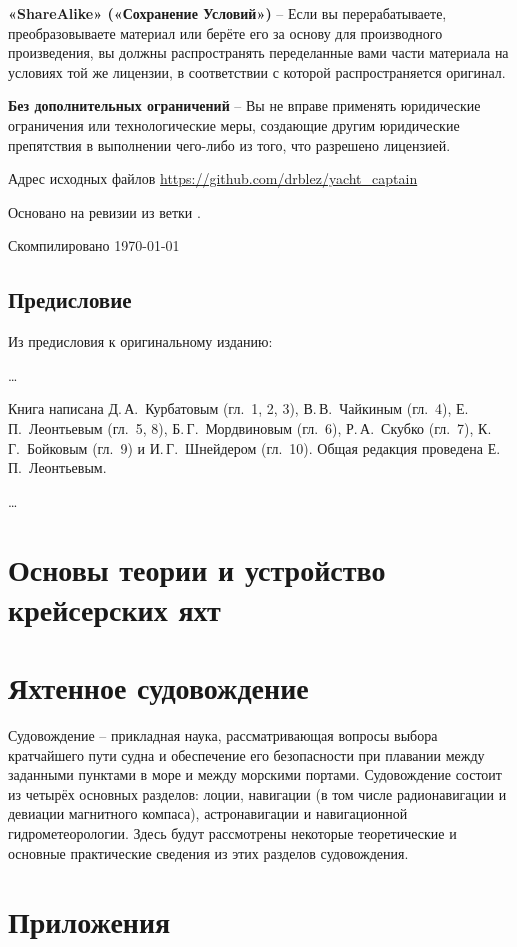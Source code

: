 \documentclass[a4paper, 12pt, twoside, final, book, russian, fittopage, cyremdash, openright]{ncc}
\begin{document}
\ccsa \textbf{«ShareAlike» («Сохранение Условий»)} \--- Если вы
перерабатываете, преобразовываете материал или берёте его за основу
для производного произведения, вы должны распространять переделанные
вами части материала на условиях той же лицензии, в соответствии с
которой распространяется оригинал.

\textbf{Без дополнительных ограничений} \--- Вы не вправе применять
юридические ограничения или технологические меры, создающие другим
юридические препятствия в выполнении чего-либо из того, что разрешено
лицензией.

Адрес исходных файлов \url{https://github.com/drblez/yacht_captain}

Основано на ревизии \texttt{\commit} из ветки \texttt{\branch}.

Скомпилировано \today

\tableofcontents
\listoffigures
\listoftables

\mainmatter

\chapter*{Предисловие}

Из предисловия к оригинальному изданию:

\ldots

Книга написана Д.\,А.~Курбатовым (гл.~1, 2, 3), В.\,В.~Чайкиным
(гл.~4), Е.\,П.~Леонтьевым (гл.~5, 8), Б.\,Г.~Мордвиновым (гл.~6),
Р.\,А.~Скубко (гл.~7), К.\,Г.~Бойковым (гл.~9) и И.\,Г.~Шнейдером
(гл.~10). Общая редакция проведена Е.\,П.~Леонтьевым.

\ldots


\part{Основы теории и устройство крейсерских яхт}






\part{Яхтенное судовождение}

Судовождение \--- прикладная наука, рассматривающая вопросы выбора
кратчайшего пути судна и обеспечение его безопасности при плавании
между заданными пунктами в море и между морскими портами. Судовождение
состоит из четырёх основных разделов: лоции, навигации (в том числе
радионавигации и девиации магнитного компаса), астронавигации и
навигационной гидрометеорологии. Здесь будут рассмотрены некоторые
теоретические и основные практические сведения из этих разделов
судовождения.








\part{Приложения}






\printindex
\end{document}
